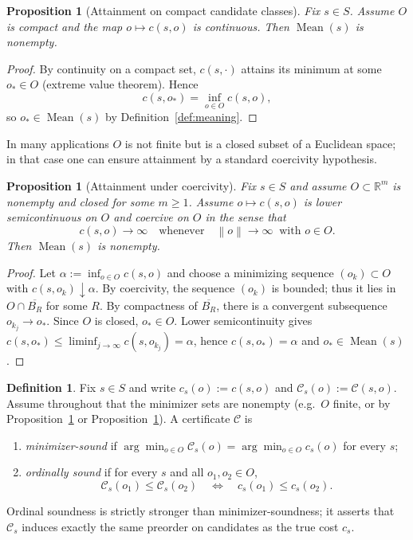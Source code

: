 \documentclass[11pt,reqno]{amsart}
\newtheorem{proposition}[theorem]{Proposition}
\theoremstyle{definition}
\newtheorem{definition}[theorem]{Definition}
\theoremstyle{remark}
\newcommand{\R}{\mathbb{R}}
\newcommand{\1}{\mathbf{1}}
\newcommand{\norm}[1]{\left\lVert #1 \right\rVert}
\newcommand{\Mean}{\operatorname{Mean}}
\begin{document}
\begin{proposition}[Attainment on compact candidate classes]\label{prop:meaning-compact}
Fix $s\in S$.
Assume $O$ is compact and the map $o\mapsto c(s,o)$ is continuous.
Then $\Mean(s)$ is nonempty.
\end{proposition}

\begin{proof}
By continuity on a compact set, $c(s,\cdot)$ attains its minimum at some $o_\ast\in O$
(extreme value theorem).
Hence
\[
c(s,o_\ast)=\inf_{o\in O}c(s,o),
\]
so $o_\ast\in\Mean(s)$ by Definition~\ref{def:meaning}.
\end{proof}


In many applications $O$ is not finite but is a closed subset of a Euclidean space; in that case one can ensure attainment by a standard coercivity hypothesis.


\begin{proposition}[Attainment under coercivity]\label{prop:meaning-coercive}
Fix $s\in S$ and assume $O\subset\R^m$ is nonempty and closed for some $m\ge 1$.
Assume $o\mapsto c(s,o)$ is lower semicontinuous on $O$ and \emph{coercive} on $O$ in the sense that
\[
c(s,o)\to\infty \quad\text{whenever}\quad \norm{o}\to\infty\ \text{ with }o\in O.
\]
Then $\Mean(s)$ is nonempty.
\end{proposition}

\begin{proof}
Let $\alpha:=\inf_{o\in O}c(s,o)$ and choose a minimizing sequence $(o_k)\subset O$ with $c(s,o_k)\downarrow\alpha$.
By coercivity, the sequence $(o_k)$ is bounded; thus it lies in $O\cap \overline{B_R}$ for some $R$.
By compactness of $\overline{B_R}$, there is a convergent subsequence $o_{k_j}\to o_\ast$.
Since $O$ is closed, $o_\ast\in O$.
Lower semicontinuity gives $c(s,o_\ast)\le \liminf_{j\to\infty} c(s,o_{k_j})=\alpha$, hence $c(s,o_\ast)=\alpha$ and $o_\ast\in\Mean(s)$.
\end{proof}


\begin{definition}\label{def:sound}
Fix $s\in S$ and write $c_s(o):=c(s,o)$ and $\mathcal{C}_s(o):=\mathcal{C}(s,o)$.
Assume throughout that the minimizer sets are nonempty (e.g.\ $O$ finite, or by Proposition~\ref{prop:meaning-compact} or Proposition~\ref{prop:meaning-coercive}).
A certificate $\mathcal{C}$ is
\begin{enumerate}[label=\textup{(\roman*)},leftmargin=2.2em]
\item \emph{minimizer-sound} if $\arg\min_{o\in O}\mathcal{C}_s(o)=\arg\min_{o\in O}c_s(o)$ for every $s$;
\item \emph{ordinally sound} if for every $s$ and all $o_1,o_2\in O$,
\[
\mathcal{C}_s(o_1)\le \mathcal{C}_s(o_2)\quad\Longleftrightarrow\quad c_s(o_1)\le c_s(o_2).
\]
\end{enumerate}
Ordinal soundness is strictly stronger than minimizer-soundness; it asserts that $\mathcal{C}_s$ induces
exactly the same preorder on candidates as the true cost $c_s$.
\end{definition}
\end{document}
